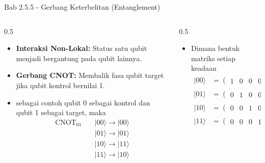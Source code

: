 \begin{frame}{Bab 2.5.5 - Gerbang Keterbelitan (Entanglement)}
    \begin{columns}
        \begin{column}{0.5\textwidth}
            \begin{itemize}
        \item \textbf{Interaksi Non-Lokal:} Status satu qubit menjadi bergantung pada qubit lainnya.
        \item \textbf{Gerbang CNOT:} Membalik fasa qubit target jika qubit kontrol bernilai 1.
        \item sebagai contoh qubit 0 sebagai kontrol dan qubit 1 sebagai target, maka
        \begin{equation*}
            \begin{split}
                \text{CNOT}_{01} \quad &|00\rangle \to |00\rangle \\
                &|01\rangle \to |01\rangle \\
                &|10\rangle \to |11\rangle \\
                &|11\rangle \to |10\rangle
            \end{split}
        \end{equation*}
    \end{itemize}
        \end{column}
        \begin{column}{0.5\textwidth}
            \begin{itemize}
                \item Dimana bentuk matriks setiap keadaan
                \begin{equation*}
                    \begin{aligned}
                        |00\rangle &= \begin{pmatrix} 1 & 0 & 0 & 0 \end{pmatrix}^T \\ 
                        |01\rangle &= \begin{pmatrix} 0 & 1 & 0 & 0 \end{pmatrix}^T \\
                        |10\rangle &= \begin{pmatrix} 0 & 0 & 1 & 0 \end{pmatrix}^T \\
                        |11\rangle &= \begin{pmatrix} 0 & 0 & 0 & 1 \end{pmatrix}^T

\end{aligned}
\end{equation*}
\end{itemize}
\end{column}
\end{columns}
\end{frame}
